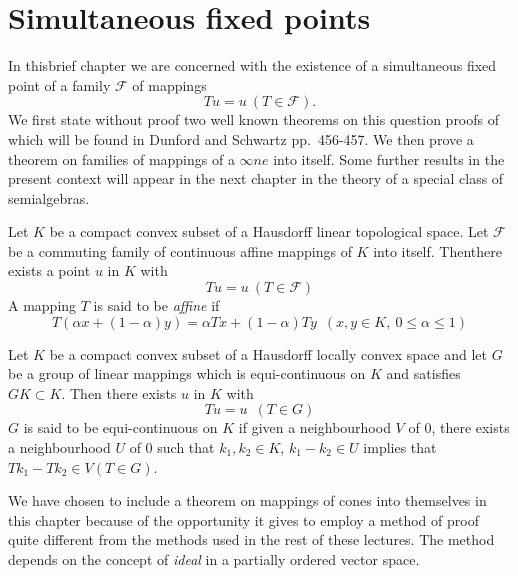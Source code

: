 \chapter{Simultaneous fixed points}

 In this\pageoriginale brief chapter we are concerned with the
 existence of a simultaneous fixed point of a family $\mathscr{F}$ of
 mappings   
 $$
 Tu = u ~ (T \in \mathscr{F}).
 $$
We first state without proof two well known theorems on this question
proofs of which will be found in Dunford and Schwartz \cite{key14}
pp.~456-457. We then prove a theorem on families of mappings of a
$\infty ne$ into  itself. Some further results in the present context
will appear in  the next chapter in the theory of a special class of
semialgebras.  

\begin{thmm}%
  Let $K$ be a compact convex subset of a Hausdorff linear topological
  space. Let $\mathscr{F}$ be a commuting family of continuous affine
  mappings of $K$ into itself. Then\pageoriginale there exists a point
  $u$ in $K$ with  
  $$
  Tu = u ~ (T \in \mathscr{F})
  $$
  A mapping $T$ is said to be \textit{affine} if
  $$
  T (\alpha x + (1 -\alpha)y) = \alpha Tx + (1-\alpha) Ty ~\;  (x,y \in
  K, ~ 0 \leq \alpha \leq 1 ) 
  $$
\end{thmm}

\begin{thmm}[Kakutani] %
  Let $K$ be a compact convex subset of a  Hausdorff locally convex
  space and let $G$ be a group of linear mappings which is
  equi-continuous on $K$ and satisfies $GK \subset K$. Then there
  exists $u$ in $K$ with 
  $$
  Tu = u ~ \; (T \in G)
  $$
  $G$ is said to be equi-continuous on $K$ if given a neighbourhood
  $V$ of 0, there exists a neighbourhood $U$ of 0 such that  
  $k_1, k_2 \in K$, $k_1 - k_2 \in U$ implies that $Tk_1- Tk_2 \in V (T
  \in G)$. 
\end{thmm}

We have chosen to include a theorem on mappings of cones into
themselves in this chapter because of the opportunity it gives to
employ a method of proof quite different from the methods used in the
rest of these lectures. The method depends on the concept of
\textit{ideal} in a partially ordered vector space. 

